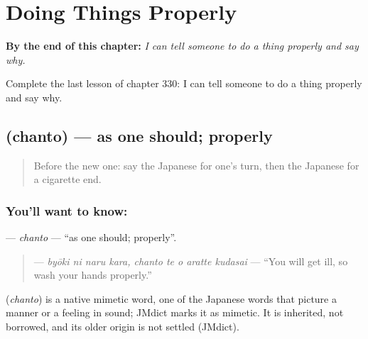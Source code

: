 
\chapter{Doing Things Properly}
\label{ch:ja-doing-things-properly}

\begin{chapteropening}
\textbf{By the end of this chapter:} \emph{I can tell someone to do a thing properly and say why.}

Complete the last lesson of chapter 330: I can tell someone to do a thing properly and say why.
\end{chapteropening}

\section[\texorpdfstring{\ja{ちゃんと} (chanto)}{ちゃんと (chanto)}]{ (chanto) — as one should; properly}

\label{lesson:JA-C330-chanto}



\begin{quote}
Before the new one: say the Japanese for one's turn, then the Japanese for a cigarette end.
\end{quote}

\subsection*{You'll want to know: }
\textbf{} — \emph{chanto} — \textquotedblleft{}as one should; properly\textquotedblright{}.

\begin{quote}
\textbf{    } — \emph{byōki ni naru kara, chanto te o aratte kudasai} — \textquotedblleft{}You will get ill, so wash your hands properly.\textquotedblright{}
\end{quote}

\begin{cousinweb}
\textbf{} (\emph{chanto}) is a native mimetic word, one of the Japanese words that picture a manner or a feeling in sound; JMdict marks it as mimetic. It is inherited, not borrowed, and its older origin is not settled (JMdict).
\end{cousinweb}

